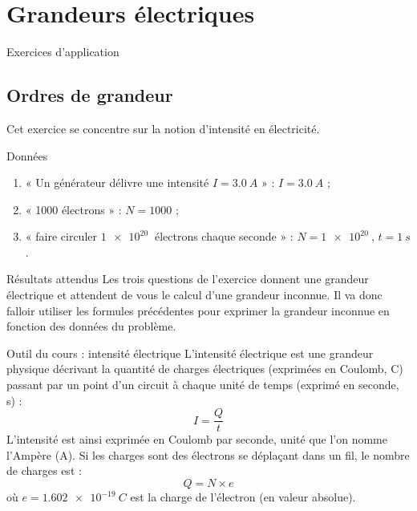 \documentclass[../main/main.tex]{subfiles}
\begin{document}
\chapter{Grandeurs électriques}\label{ch:O1}
\vspace*{-47pt}

\begin{center}
    \Huge Exercices d'application
\end{center}

\section{Ordres de grandeur}

Cet exercice se concentre sur la notion d'intensité en électricité.

\begin{NCdefi}{Données}
	\begin{enumerate}
        \item « Un générateur délivre une intensité $I = \SI{3.0}{A}$ » :
            $I = \SI{3.0}{A}$ ;
		\item « 1000 électrons » : $N = 1000$ ;
        \item « faire circuler $\SI{1e20}{}$ électrons chaque seconde » : $N =
            \SI{1e20}{}$, $t = \SI{1}{s}$.
	\end{enumerate}
\end{NCdefi}

\begin{NCprop}{Résultats attendus}
    Les trois questions de l'exercice donnent une grandeur électrique et
    attendent de vous le calcul d'une grandeur inconnue. Il va donc falloir
    utiliser les formules précédentes pour exprimer la grandeur inconnue en
    fonction des données du problème.
\end{NCprop}

\begin{NCdemo}{Outil du cours : intensité électrique}
    L'intensité électrique est une grandeur physique décrivant la quantité de
    charges électriques (exprimées en Coulomb, C) passant par un point d'un
    circuit à chaque unité de temps (exprimé en seconde, s) :
	\begin{equation}
		I = \dfrac{Q}{t} \label{eq:1.1.intensite}
	\end{equation}
    L'intensité est ainsi exprimée en Coulomb par seconde, unité que l'on nomme
    l'Ampère (A). Si les charges sont des électrons se déplaçant dans un fil, le
    nombre de charges est :
	\begin{equation}
		Q = N\times e \label{eq:1.1.charge}
	\end{equation}
    où $e = \SI{1.602e-19}{C}$ est la charge de l'électron (en valeur
    absolue).
\end{NCdemo}
\end{document}
